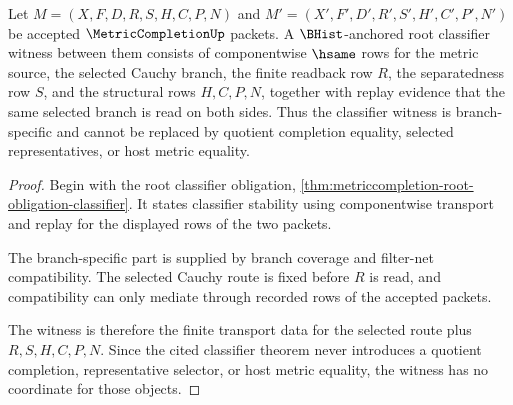 \begin{theorem}
\label{thm:metriccompletion-root-obligation-classifier-witness}
Let $M=(X,F,D,R,S,H,C,P,N)$ and $M'=(X',F',D',R',S',H',C',P',N')$ be accepted $\MetricCompletionUp$ packets. A $\BHist$-anchored root classifier witness between them consists of componentwise $\hsame$ rows for the metric source, the selected Cauchy branch, the finite readback row $R$, the separatedness row $S$, and the structural rows $H,C,P,N$, together with replay evidence that the same selected branch is read on both sides. Thus the classifier witness is branch-specific and cannot be replaced by quotient completion equality, selected representatives, or host metric equality.
\end{theorem}
\begin{proof}
Begin with the root classifier obligation, \autoref{thm:metriccompletion-root-obligation-classifier}. It states classifier stability using componentwise transport and replay for the displayed rows of the two packets.

The branch-specific part is supplied by branch coverage and filter-net compatibility. The selected Cauchy route is fixed before $R$ is read, and compatibility can only mediate through recorded rows of the accepted packets.

The witness is therefore the finite transport data for the selected route plus $R,S,H,C,P,N$. Since the cited classifier theorem never introduces a quotient completion, representative selector, or host metric equality, the witness has no coordinate for those objects.
\end{proof}

